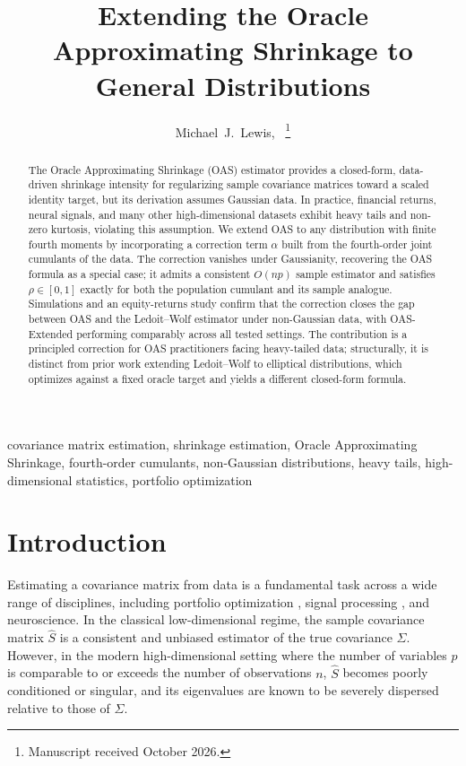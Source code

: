 \documentclass[journal]{IEEEtran}
\begin{document}
\title{Extending the Oracle Approximating Shrinkage to General Distributions}
\author{Michael~J.~Lewis,~%
\thanks{Manuscript received October 2026.}}

\maketitle

\begin{abstract}
The Oracle Approximating Shrinkage (OAS) estimator provides a closed-form, data-driven
shrinkage intensity for regularizing sample covariance matrices toward a scaled identity
target, but its derivation assumes Gaussian data.
In practice, financial returns, neural signals, and many other high-dimensional datasets
exhibit heavy tails and non-zero kurtosis, violating this assumption.
We extend OAS to any distribution with finite fourth moments by incorporating a correction
term $\alpha$ built from the fourth-order joint cumulants of the data.
The correction vanishes under Gaussianity, recovering the OAS formula as a special
case; it admits a consistent $O(np)$ sample estimator and satisfies $\rho\in[0,1]$ exactly
for both the population cumulant and its sample analogue.
Simulations and an equity-returns study confirm that the correction closes the gap between
OAS and the Ledoit--Wolf estimator under non-Gaussian data, with OAS-Extended
performing comparably across all tested settings.
The contribution is a principled correction for OAS practitioners facing heavy-tailed data;
structurally, it is distinct from prior work extending Ledoit--Wolf to elliptical
distributions, which optimizes against a fixed oracle target and yields a different
closed-form formula.
\end{abstract}

\begin{IEEEkeywords}
covariance matrix estimation, shrinkage estimation, Oracle Approximating Shrinkage,
fourth-order cumulants, non-Gaussian distributions, heavy tails, high-dimensional statistics,
portfolio optimization
\end{IEEEkeywords}

\section{Introduction}\label{sec-intro}

Estimating a covariance matrix from data is a fundamental task across a wide range of
disciplines, including portfolio optimization \cite{LW2004}, signal processing \cite{OAS},
and neuroscience.
In the classical low-dimensional regime, the sample covariance matrix $\hat{S}$ is a
consistent and unbiased estimator of the true covariance $\Sigma$.
However, in the modern high-dimensional setting where the number of variables $p$ is
comparable to or exceeds the number of observations $n$, $\hat{S}$ becomes poorly
conditioned or singular, and its eigenvalues are known to be severely dispersed relative
to those of $\Sigma$.
\end{document}
